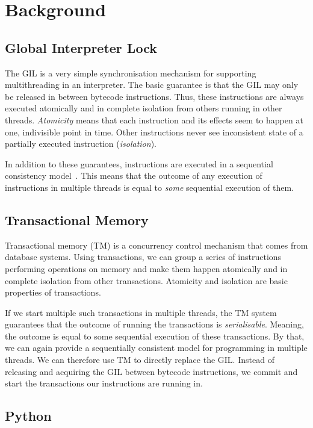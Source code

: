 \documentclass{sigplanconf}
\begin{document}
\section{Background}

\subsection{Global Interpreter Lock}

The GIL is a very simple synchronisation mechanism for supporting
multithreading in an interpreter. The basic guarantee is that the GIL
may only be released in between bytecode instructions. Thus, these
instructions are always executed atomically and in complete isolation
from others running in other threads. \emph{Atomicity} means that each
instruction and its effects seem to happen at one, indivisible point
in time. Other instructions never see inconsistent state of a
partially executed instruction (\emph{isolation}).

In addition to these guarantees, instructions are executed in a
sequential consistency model~\cite{lamport79}. This means that
the outcome of any execution of instructions in multiple threads is
equal to \emph{some} sequential execution of them.


\subsection{Transactional Memory}

Transactional memory (TM) is a concurrency control mechanism that
comes from database systems. Using transactions, we can group a series
of instructions performing operations on memory and make them happen
atomically and in complete isolation from other transactions.
Atomicity and isolation are basic properties of transactions.

If we start multiple such transactions in multiple threads, the TM
system guarantees that the outcome of running the transactions is
\emph{serialisable}. Meaning, the outcome is equal to some sequential
execution of these transactions. By that, we can again provide a
sequentially consistent model for programming in multiple threads. We
can therefore use TM to directly replace the GIL. Instead of releasing
and acquiring the GIL between bytecode instructions, we commit and
start the transactions our instructions are running in.

\subsection{Python}
\end{document}
